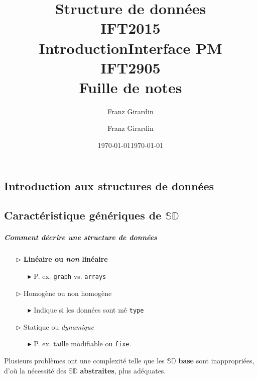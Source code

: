 \documentclass{report}
\title{\Huge{Structure de données}\\{IFT2015}\\{\textbf{Introduction}}}
\author{\huge{Franz Girardin}}
\date{\today}
\title{\Huge{Interface PM}\\{IFT2905}\\{\textbf{Fuille de notes}}}
\author{\huge{Franz Girardin}}
\date{\today}
\begin{document}
\maketitle
\pagebreak
\tableofcontents
\pagebreak
\begin{multicols*}{3}


    \footnotesize

    \chapter{Introduction aux structures de données}
    \section{Caractéristique génériques de $\mathbb{SD}$ }

    \paragraph{Comment décrire une structure de données}
    \begin{itemize}
      \item [$\rhd$ ] \textbf{Linéaire ou \textit{non} linéaire  }  
        \begin{itemize}
          \item [$\blacktriangleright$ ] P. ex. 
            \texttt{graph} vs. \texttt{arrays}    
        \end{itemize}
      \item [$\rhd$ ] Homogène ou non homogène  
        \begin{itemize}
          \item [$\blacktriangleright$ ] Indique si les données sont mê 
            \texttt{type}  
        \end{itemize}
      \item [$\rhd$ ] Statique ou \textit{dynamique}  
        \begin{itemize}
          \item [$\blacktriangleright$ ] P. ex. taille modifiable ou 
            \texttt{fixe}.   
        \end{itemize} 
    \end{itemize}
    
    \begin{note}{}{}
        Plusieurs problèmes ont une complexité telle que les $\mathbb{SD}$ 
        \textbf{base} sont inappropriées, d’où la nécessité 
        des $\mathbb{SD}$ \textbf{abstraites}, plus adéquates.  
    \end{note}


\end{multicols*}
\end{document}
